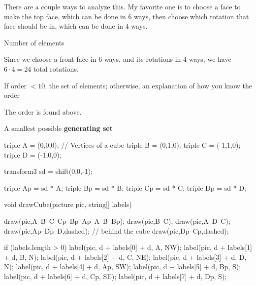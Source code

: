 \documentclass[../key.tex]{subfiles}
\begin{document}
\noindent There are a couple ways to analyze this. My favorite one is to choose a face to make the top face, which can be done in $6$ ways, then choose which rotation that face should be in, which can be done in $4$ ways.

\begin{inner_problem}[start=1]
\item Number of elements
\end{inner_problem}

\noindent Since we choose a front face in $6$ ways, and its rotations in $4$ ways, we have $6\cdot 4=24$ total rotations.

\begin{inner_problem}
\item If order $< 10$, the set of elements; otherwise, an explanation of how you know the order
\end{inner_problem}

\noindent The order is found above.

\begin{inner_problem}
\item A smallest possible \textbf{generating set}
\end{inner_problem}

\begin{asydef}
triple A = (0,0,0); // Vertices of a cube
triple B = (0,1,0);
triple C = (-1,1,0);
triple D = (-1,0,0);

transform3 sd = shift(0,0,-1);

triple Ap = sd * A;
triple Bp = sd * B;
triple Cp = sd * C;
triple Dp = sd * D;

void drawCube(picture pic, string[] labels) {
    draw(pic,A--B--C--Cp--Bp--Ap--A--B--Bp);
    draw(pic,B--C);
    draw(pic,A--D--C);
    draw(pic,Ap--Dp--D,dashed); // behind the cube
    draw(pic,Dp--Cp,dashed);

    if (labels.length > 0) {
        label(pic, d + labels[0] + d, A, NW);
        label(pic, d + labels[1] + d, B, N);
        label(pic, d + labels[2] + d, C, NE);
        label(pic, d + labels[3] + d, D, N);
        label(pic, d + labels[4] + d, Ap, SW);
        label(pic, d + labels[5] + d, Bp, S);
        label(pic, d + labels[6] + d, Cp, SE);
        label(pic, d + labels[7] + d, Dp, S);
    }
}
\end{asydef}
\end{document}
